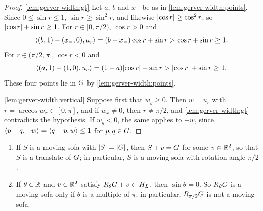 \begin{proof}
\ref{lem:gerver-width:gt} Let $a$, $b$ and $x_-$ be as in
\ref{lem:gerver-width:points}. Since $0\le\sin r\le1$, $\sin r\ge\sin^2r$, and
likewise $\lvert \cos r\rvert\ge\cos^2r$; so $\lvert \cos r\rvert+\sin r\ge1$. For
$r\in[0,\pi/2)$, $\cos r>0$ and
\[
  \langle (b,1)-(x_-,0),u_r\rangle=(b-x_-)\cos r+\sin r>\cos r+\sin r\ge1.
\]
For $r\in(\pi/2,\pi]$, $\cos r<0$ and
\[
  \langle (a,1)-(1,0),u_r\rangle=(1-a)\lvert \cos r\rvert+\sin r>\lvert \cos r\rvert+\sin r\ge1.
\]
These four points lie in $G$ by \ref{lem:gerver-width:points}.

\ref{lem:gerver-width:vertical} Suppose first that $w_y\ge0$. Then $w=u_r$ with
$r=\arccos w_x\in[0,\pi]$, and if $w_x\ne0$, then $r\ne\pi/2$, and
\ref{lem:gerver-width:gt} contradicts the hypothesis. If $w_y<0$, the same
applies to $-w$, since $\langle p-q,-w\rangle=\langle q-p,w\rangle\le1$ for $p,q\in G$.
\end{proof}

\begin{corollary}\label{cor:translate}
\begin{enumerate}[label=(\alph*)]
\item\label{cor:translate:main} If $S$ is a moving sofa with $\lvert S\rvert=\lvert G\rvert$,
then $S+v=G$ for some $v\in\mathbb{R}^2$, so that $S$ is a translate of $G$; in
particular, $S$ is a moving sofa with rotation angle $\pi/2$.
\item\label{cor:translate:rot} If $\theta\in\mathbb{R}$ and $v\in\mathbb{R}^2$ satisfy
$R_\theta G+v\subset H_L$, then $\sin\theta=0$. So $R_\theta G$ is a moving
sofa only if $\theta$ is a multiple of $\pi$; in particular, $R_{\pi/2}G$ is
not a moving sofa.
\end{enumerate}
\end{corollary}

